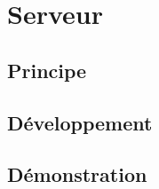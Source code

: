 \documentclass{beamer}
\begin{document}
  {
    \section{Serveur}
      
      \subsection{Principe}
	\begin{frame}
	  
	\end{frame}

      \subsection{Développement}
	\begin{frame}
	
	\end{frame}
	
      \subsection{Démonstration}
	\begin{frame}
	 
	\end{frame}
  }
  
\end{document}
